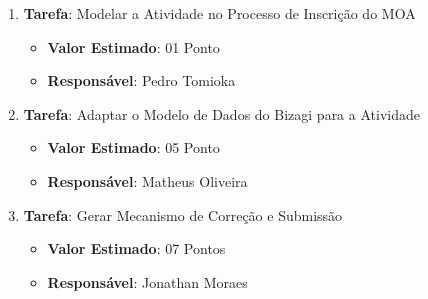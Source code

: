 \begin{itemize}
{\begin{itemize}
{			\begin{enumerate}
				\item{\textbf{Tarefa}: Modelar a Atividade no Processo de Inscrição do MOA
					\begin{itemize}
						\item{\textbf{Valor Estimado}: 01 Ponto}
						\item{\textbf{Responsável}: Pedro Tomioka}
					\end{itemize}}
				\item{\textbf{Tarefa}: Adaptar o Modelo de Dados do Bizagi para a Atividade
					\begin{itemize}
						\item{\textbf{Valor Estimado}: 05 Ponto}
						\item{\textbf{Responsável}: Matheus Oliveira}
					\end{itemize}}
				\item{\textbf{Tarefa}: Gerar Mecanismo de Correção e Submissão
					\begin{itemize}
						\item{\textbf{Valor Estimado}: 07 Pontos}
						\item{\textbf{Responsável}: Jonathan Moraes}
					\end{itemize}}
			\end{enumerate}}
		\end{itemize}}
\end{itemize}